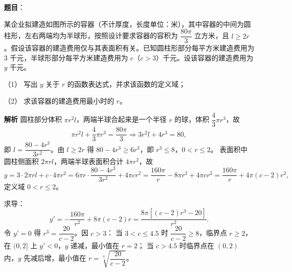 \begin{answer}

\textbf{题目}：

某企业拟建造如图所示的容器（不计厚度，长度单位：米），其中容器的中间为圆柱形，左右两端均为半球形，按照设计要求容器的容积为 $\dfrac{80\pi}{3}$ 立方米，且 $l\geqslant2r$。假设该容器的建造费用仅与其表面积有关。已知圆柱形部分每平方米建造费用为 $3$ 千元，半球形部分每平方米建造费用为 $c$（$c>3$）千元。设该容器的建造费用为 $y$ 千元。

（1） 写出 $y$ 关于 $r$ 的函数表达式，并求该函数的定义域；

（2） 求该容器的建造费用最小时的 $r$。
\nopagebreak[4]
\begin{center}\end{center}
\nopagebreak[4]
\textbf{解析}
圆柱部分体积 $\pi r^2l$，两端半球合起来是一个半径 $r$ 的球，体积 $\dfrac43\pi r^3$，故
\nopagebreak[4]
\[\pi r^2l+\frac43\pi r^3=\frac{80\pi}3\Longrightarrow 3r^2l+4r^3=80,\]
即 $l=\dfrac{80-4r^3}{3r^2}$。由 $l\geqslant2r$ 得 $80-4r^3\geqslant6r^3$，即 $r^3\leqslant8$，$0<r\leqslant2$。
表面积中圆柱侧面积 $2\pi rl$，两端半球表面积合计 $4\pi r^2$，故
\nopagebreak[4]
\[y=3\cdot2\pi rl+c\cdot4\pi r^2=6\pi r\cdot\frac{80-4r^3}{3r^2}+4\pi cr^2
=\frac{160\pi}{r}-8\pi r^2+4\pi cr^2=\frac{160\pi}{r}+4\pi(c-2)r^2,\]
定义域 $0<r\leqslant2$。

求导：
\nopagebreak[4]
\[y'=-\frac{160\pi}{r^2}+8\pi(c-2)r=\frac{8\pi[(c-2)r^3-20]}{r^2}.\]
令 $y'=0$ 得 $r^3=\dfrac{20}{c-2}$。因 $c>3$：
当 $3<c\leqslant4.5$ 时 $\dfrac{20}{c-2}\geqslant8$，临界点 $r\geqslant2$，在 $(0,2]$ 上 $y'<0$，$y$ 递减，最小值在 $r=2$；
当 $c>4.5$ 时临界点在 $(0,2)$ 内，$y$ 先减后增，最小值在 $r=\sqrt[3]{\dfrac{20}{c-2}}$。



\end{answer}
